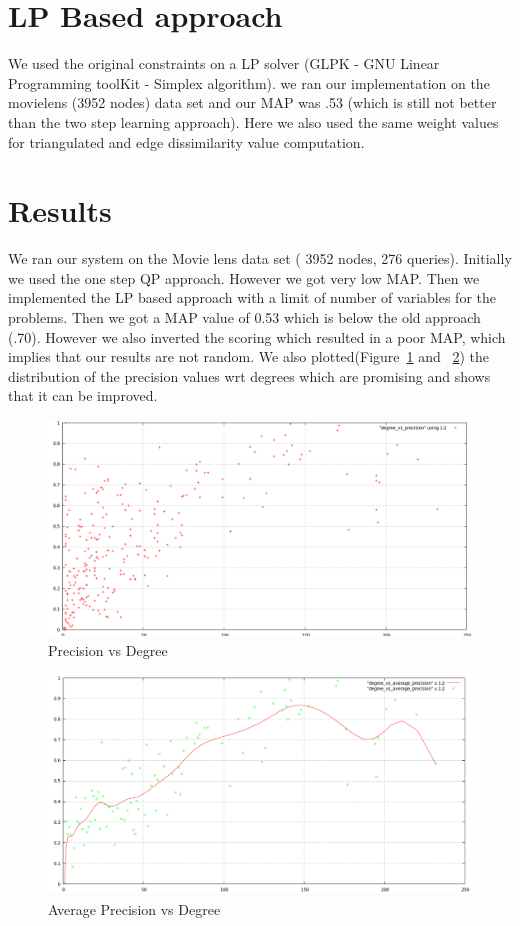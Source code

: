 \documentclass{article}
\begin{document}
\section*{LP Based approach}
We used the original constraints on a LP solver (GLPK - GNU Linear Programming toolKit - Simplex algorithm). we ran our implementation on the movielens (3952 nodes) data set and our MAP was .53 (which is still not better than the two step learning approach). Here we also used the same weight values for triangulated and edge dissimilarity value computation.

\section*{Results}
We ran our system on the Movie lens data set ( 3952 nodes, 276 queries). Initially we used the one step QP approach. However we got very low MAP. Then we implemented the LP based approach with a limit of number of variables for the problems. Then we got a MAP value of 0.53 which is below the old approach (.70). However we also inverted the scoring which resulted in a poor MAP, which implies that our results are not random. We also plotted(Figure~\ref{fig:precisiondegree} and ~\ref{fig:averageprecisiondegree}) the distribution of the precision values wrt degrees which are promising and shows that it can be improved.
\begin{figure}
\centering
\includegraphics[width=\textwidth,height=\textheight,keepaspectratio]{total.png}
\caption{Precision vs Degree}
\label{fig:precisiondegree}
\end{figure}
\begin{figure}
\centering
\includegraphics[width=\textwidth,height=\textheight,keepaspectratio]{average.png}
\caption{Average Precision vs Degree}
\label{fig:averageprecisiondegree}
\end{figure}
\end{document}
